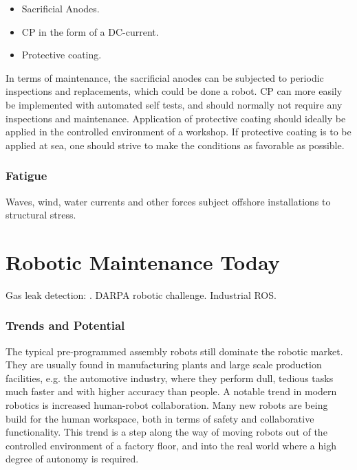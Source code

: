 \begin{itemize}
	\item Sacrificial Anodes.
	\item \ac{CP} in the form of a DC-current.
	\item Protective coating.
\end{itemize} 

In terms of maintenance, the sacrificial anodes can be subjected to periodic inspections and replacements, which could be done a robot. \ac{CP} can more easily be implemented with automated self tests, and should normally not require any inspections and maintenance\cite{ElReedy2012383}. Application of protective coating should ideally be applied in the controlled environment of a workshop. If protective coating is to be applied at sea, one should strive to make the conditions as favorable as possible. 

\subsubsection{Fatigue}

Waves, wind, water currents and other forces subject offshore installations to structural stress.

\section{Robotic Maintenance Today}

Gas leak detection: \cite{FSR2014_gas_leak}. DARPA robotic challenge. Industrial ROS.
 
\subsubsection{Trends and Potential}
 
The typical pre-programmed assembly robots still dominate the robotic market. They are usually found in manufacturing plants and large scale production facilities\cite{ifr_statistics}, e.g. the automotive industry, where they perform dull, tedious tasks much faster and with higher accuracy than people. A notable trend in modern robotics is increased human-robot collaboration\cite{cobotsEurope}. Many new robots are being build for the human workspace, both in terms of safety and collaborative functionality. This trend is a step along the way of moving robots out of the controlled environment of a factory floor, and into the real world where a high degree of autonomy is required.

